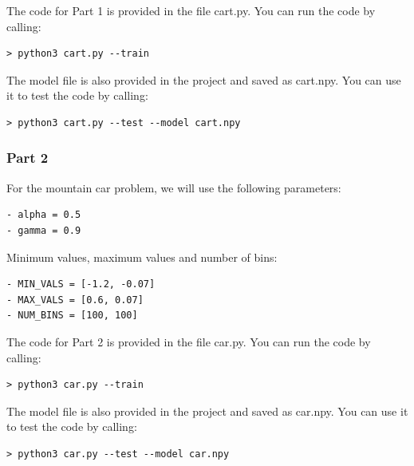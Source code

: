 \documentclass[twoside,10pt]{article}
\begin{document}
The code for Part 1 is provided in the file cart.py. You can run the
code by calling:

\begin{verbatim}
> python3 cart.py --train
\end{verbatim}

The model file is also provided in the project and saved as cart.npy.
You can use it to test the code by calling:

\begin{verbatim}
> python3 cart.py --test --model cart.npy
\end{verbatim}


\subsubsection*{Part 2}\label{part-2}

For the mountain car problem, we will use the following parameters:

\begin{verbatim}
- alpha = 0.5
- gamma = 0.9
\end{verbatim}

Minimum values, maximum values and number of bins:

\begin{verbatim}
- MIN_VALS = [-1.2, -0.07]
- MAX_VALS = [0.6, 0.07]
- NUM_BINS = [100, 100]
\end{verbatim}

The code for Part 2 is provided in the file car.py. You can run the code
by calling:

\begin{verbatim}
> python3 car.py --train
\end{verbatim}

The model file is also provided in the project and saved as car.npy. You
can use it to test the code by calling:

\begin{verbatim}
> python3 car.py --test --model car.npy
\end{verbatim}
\end{document}
